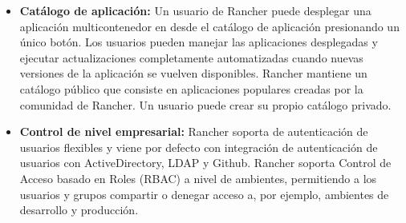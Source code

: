 \begin{itemize}
  \item \textbf{Catálogo de aplicación:}
    Un usuario de Rancher puede desplegar una aplicación multicontenedor en
     desde el catálogo de aplicación presionando un único botón.
    Los usuarios pueden manejar las aplicaciones desplegadas y ejecutar
    actualizaciones completamente automatizadas cuando nuevas versiones de la
    aplicación se vuelven disponibles. Rancher mantiene un catálogo público que
    consiste en aplicaciones populares creadas por la comunidad de Rancher. Un
    usuario puede crear su propio catálogo privado.

  \item \textbf{Control de nivel empresarial:}
    Rancher soporta  de autenticación de usuarios flexibles y
    viene por defecto con integración de autenticación de usuarios con
    ActiveDirectory, LDAP y Github. Rancher soporta Control de Acceso basado en
    Roles (RBAC) a nivel de ambientes, permitiendo a los usuarios y grupos
    compartir o denegar acceso a, por ejemplo, ambientes de desarrollo y
    producción.

\end{itemize}

\clearpage
